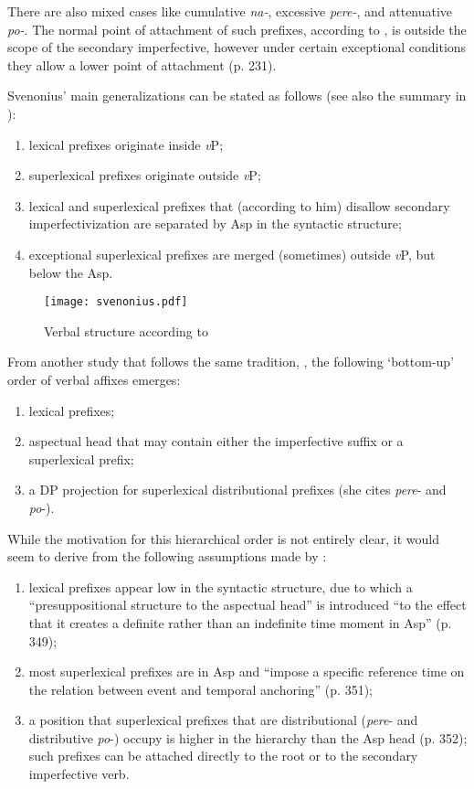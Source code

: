 There are also mixed cases like cumulative \textit{na-}, excessive \textit{pere-}, and attenuative \textit{po-}. The normal point of attachment of such prefixes, according to \citet{Svenonius:04b}, is outside the scope of the secondary imperfective, however under certain exceptional conditions they allow a lower point of attachment (p. 231).

Svenonius' main generalizations can be stated as follows (see also the summary in \citealt{Svenonius:12}): 

\begin{enumerate}
\item lexical prefixes originate inside \textit{v}P;
\item superlexical prefixes originate outside \textit{v}P;
\item lexical and superlexical prefixes that (according to him) disallow secondary imperfectivization are separated by Asp in the syntactic structure; 
\item exceptional superlexical prefixes are merged (sometimes) outside \textit{v}P, but below the Asp.
\end{enumerate}
\begin{figure}
\begin{center}
\texttt{[image: svenonius.pdf]}
\caption{\label{fig:svenonius} Verbal structure according to \citet[231]{Svenonius:04b}}
\end{center}
\end{figure}
From another study that follows the same tradition, \citealt{Ramchand:04}, the following `bottom-up' order of verbal affixes emerges:
\begin{enumerate}
\item lexical prefixes;
\item aspectual head that may contain either the imperfective suffix or a superlexical prefix;
\item a DP projection for superlexical distributional prefixes (she cites \textit{pere}- and \textit{po}-). 
\end{enumerate}
While the motivation for this hierarchical order is not entirely clear, it would seem to derive from the following assumptions made by \citet{Ramchand:04}: 
\begin{enumerate}
\item lexical prefixes appear low in the syntactic structure, due to which a ``presuppositional structure to the aspectual head'' is introduced ``to the effect that it creates a definite rather than an indefinite time moment in Asp'' (p. 349);
\item most superlexical prefixes are in Asp and ``impose a specific reference time on the relation between event and temporal anchoring'' (p. 351);
\item a position that superlexical prefixes that are distributional (\textit{pere}- and distributive \textit{po}-) occupy is higher in the hierarchy than the Asp head (p. 352); such prefixes can be attached directly to the root or to the secondary imperfective verb.
\end{enumerate}
